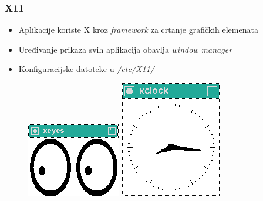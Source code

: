 \documentclass[t,table,usenames,dvipsnames]{beamer}
\begin{document}
\begin{frame}
	\frametitle{X11}
	\begin{itemize}
		\item Aplikacije koriste X kroz \textit{framework} za crtanje grafičkih elemenata
		\item Uređivanje prikaza svih aplikacija obavlja \emph{window manager}
		\item Konfiguracijske datoteke u \textit{/etc/X11/}
	\end{itemize}
	
	\begin{figure}[h]
		\begin{minipage}{0.25\textwidth}
			\centering
			\includegraphics[width=\linewidth]{xeyes.png}
		\end{minipage}
		\begin{minipage}{0.25\textwidth}
			\centering
			\includegraphics[width=\linewidth]{xclock.png}

\end{minipage}
\end{figure}
\end{frame}
\end{document}
